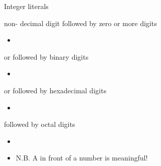 \begin{frame}{Integer literals}

  \begin{description}[<+->]
  \item[decimal] non- decimal digit followed by zero or more digits
    \begin{itemize}[<.->]
    \item {}
    \end{itemize}
  \item[binary]  or  followed by binary digits
    \begin{itemize}[<.->]
    \item {}
    \end{itemize}
  \item[exadecimal]  or  followed by hexadecimal digits
    \begin{itemize}[<.->]
    \item {}
    \end{itemize}
  \item[octal]  followed by octal digits
    \begin{itemize}[<.->]
    \item {}
    \item N.B. A  in front of a number is meaningful!
    \end{itemize}
  \end{description}


\end{frame}


